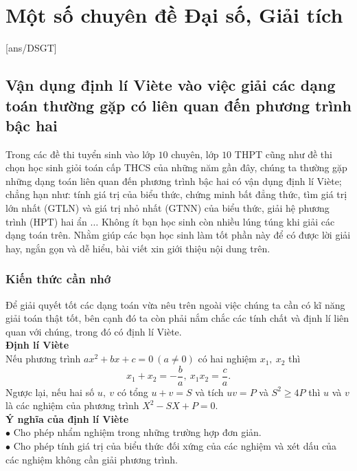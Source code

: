 \chapter{Một số chuyên đề Đại số, Giải tích}
[ans/DSGT]

\section{Vận dụng định lí Viète vào việc giải các dạng toán thường gặp có liên quan đến phương trình bậc hai}
\begin{center}
	\textbf{\color{violet}{Phạm Trọng Thư\\
			(GV THPT chuyên Nguyễn Quang Diêu, Đồng Tháp)\\
			Trích tạp chí Toán học \& Tuổi trẻ số 481.}}
\end{center}
Trong các đề thi tuyển sinh vào lớp $10$ chuyên, lớp $10$ THPT cũng như đề thi chọn học sinh giỏi toán cấp THCS của những năm gần đây, chúng ta thường gặp những dạng toán liên quan đến phương trình bậc hai có vận dụng định lí Viète; chẳng hạn như: tính giá trị của biểu thức, chứng minh bất đẳng thức, tìm giá trị lớn nhất (GTLN) và giá trị nhỏ nhất (GTNN) của biểu thức, giải hệ phương trình (HPT) hai ẩn $\ldots$ Không ít bạn học sinh còn nhiều lúng túng khi giải các dạng toán trên. Nhằm giúp các bạn học sinh làm tốt phần này để có được lời giải hay, ngắn gọn và dễ hiểu, bài viết xin giới thiệu nội dung trên.
\subsection{Kiến thức cần nhớ}
Để giải quyết tốt các dạng toán vừa nêu trên ngoài việc chúng ta cần có kĩ năng giải toán thật tốt, bên cạnh đó ta còn phải nắm chắc các tính chất và định lí liên quan với chúng, trong đó có định lí Viète.\\
\textbf{Định lí Viète}\\
Nếu phương trình $ax^2+bx+c=0~(a \ne 0)$ có hai nghiệm $x_1,~x_2$ thì $$x_1+x_2=-\dfrac{b}{a},~x_1x_2=\dfrac{c}{a}.$$
Ngược lại, nếu hai số $u,~v$ có tổng $u+v=S$ và tích $uv=P$ và $S^2 \geqslant 4P$ thì $u$ và $v$ là các nghiệm của phương trình $X^2-SX+P=0.$\\
\textbf{Ý nghĩa của định lí Viète}\\
$\bullet$ Cho phép nhẩm nghiệm trong những trường hợp đơn giản.\\
$\bullet$ Cho phép tính giá trị của biểu thức đối xứng của các nghiệm và xét dấu của các nghiệm không cần giải phương trình.

